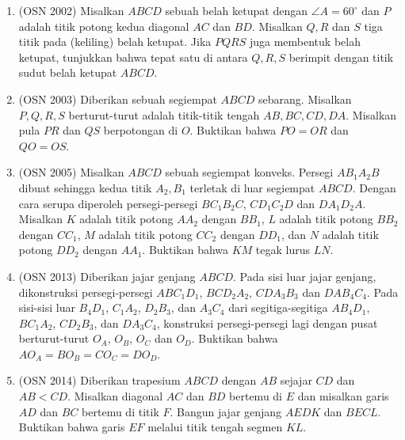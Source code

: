 \documentclass[12pt,a4paper]{article}
\begin{document}
\begin{enumerate}

\item (OSN 2002) Misalkan $ABCD$ sebuah belah ketupat dengan $\angle A=60^{\circ}$ dan $P$ adalah titik potong kedua diagonal $AC$ dan $BD$. Misalkan $Q, R$ dan $S$ tiga titik pada (keliling) belah ketupat. Jika $PQRS$ juga membentuk belah ketupat, tunjukkan bahwa tepat satu di antara $Q, R, S$ berimpit dengan titik sudut belah ketupat $ABCD$.

\item (OSN 2003) Diberikan sebuah segiempat $ABCD$ sebarang. Misalkan $P, Q, R, S$ berturut-turut adalah titik-titik tengah $AB, BC, CD, DA$. Misalkan pula $PR$ dan $QS$ berpotongan di $O$. Buktikan bahwa $PO=OR$ dan $QO=OS$.

\item (OSN 2005) Misalkan $ABCD$ sebuah segiempat konveks. Persegi $AB_{1}A_{2}B$ dibuat sehingga kedua titik $A_{2}, B_{1}$ terletak di luar segiempat $ABCD$. Dengan cara serupa diperoleh persegi-persegi $BC_{1}B_{2}C$, $CD_{1}C_{2}D$ dan $DA_{1}D_{2}A$. Misalkan $K$ adalah titik potong $AA_{2}$ dengan $BB_{1}$, $L$ adalah titik potong $BB_{2}$ dengan $CC_{1}$, $M$ adalah titik potong $CC_{2}$ dengan $DD_{1}$, dan $N$ adalah titik potong $DD_{2}$ dengan $AA_{1}$. Buktikan bahwa $KM$ tegak lurus $LN$.

\item (OSN 2013) Diberikan jajar genjang $ABCD$. Pada sisi luar jajar genjang, dikonstruksi persegi-persegi $ABC_{1}D_{1}$, $BCD_{2}A_{2}$, $CDA_{3}B_{3}$ dan $DAB_{4}C_{4}$. Pada sisi-sisi luar $B_{4}D_{1}$, $C_{1}A_{2}$, $D_{2}B_{3}$, dan $A_{3}C_{4}$ dari segitiga-segitiga $AB_{4}D_{1}$, $BC_{1}A_{2}$, $CD_{2}B_{3}$, dan $DA_{3}C_{4}$, konstruksi persegi-persegi lagi dengan pusat berturut-turut $O_{A}$, $O_{B}$, $O_{C}$ dan $O_{D}$. Buktikan bahwa $AO_{A}=BO_{B}=CO_{C}=DO_{D}$.

\item (OSN 2014) Diberikan trapesium $ABCD$ dengan $AB$ sejajar $CD$ dan $AB<CD$. Misalkan diagonal $AC$ dan $BD$ bertemu di $E$ dan misalkan garis $AD$ dan $BC$ bertemu di titik $F$. Bangun jajar genjang $AEDK$ dan $BECL$. Buktikan bahwa garis $EF$ melalui titik tengah segmen $KL$.


\end{enumerate}
\end{document}
